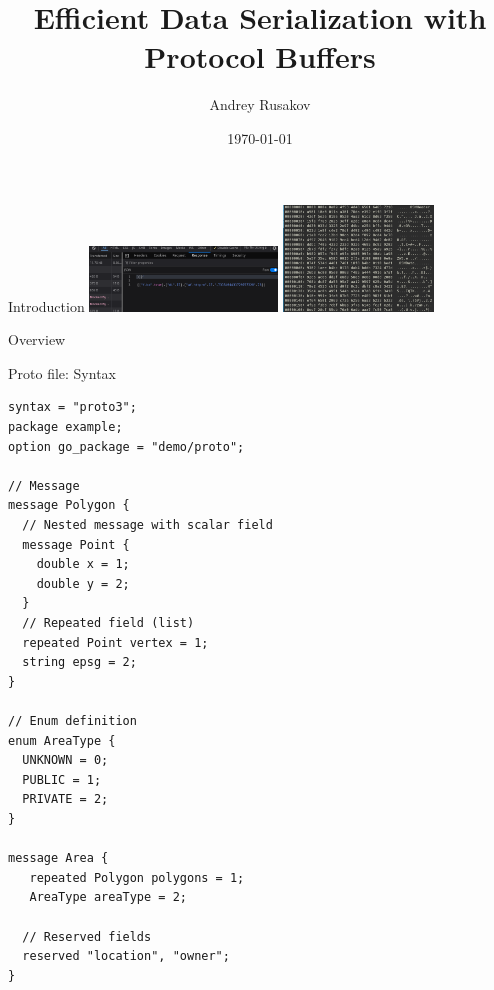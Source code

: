 \documentclass{beamer}
\title{Efficient Data Serialization with Protocol Buffers}
\author{Andrey Rusakov}
\date{\today}
\begin{document}
\begin{frame}
\titlepage
\end{frame}

\begin{frame}{Introduction}
\centering
\includegraphics[width=5cm]{gmail-proto}
\includegraphics[angle=45,width=4cm]{planet-header}
\end{frame}

\begin{frame}[fragile]{Overview}
\end{frame}

\begin{frame}[fragile]{Proto file: Syntax}
\begin{lstlisting}[caption={Typical protocol buffer file}]
syntax = "proto3";
package example;
option go_package = "demo/proto";

// Message
message Polygon {
  // Nested message with scalar field
  message Point {
    double x = 1;
    double y = 2;
  }
  // Repeated field (list)
  repeated Point vertex = 1;
  string epsg = 2;
}

// Enum definition
enum AreaType {
  UNKNOWN = 0;
  PUBLIC = 1;
  PRIVATE = 2;
}

message Area {
   repeated Polygon polygons = 1;
   AreaType areaType = 2;

  // Reserved fields
  reserved "location", "owner";
}
\end{lstlisting}
\end{frame}
\end{document}
